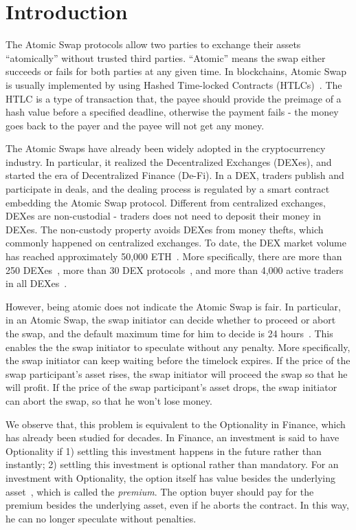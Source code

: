 \section{Introduction}
\label{sec:intro}

The Atomic Swap protocols allow two parties to exchange their assets ``atomically'' without trusted third parties.
``Atomic'' means the swap either succeeds or fails for both parties at any given time.
In blockchains, Atomic Swap is usually implemented by using Hashed Time-locked Contracts (HTLCs)~\cite{poon2016bitcoin}.
The HTLC is a type of transaction that, the payee should provide the preimage of a hash value before a specified deadline, otherwise the payment fails - the money goes back to the payer and the payee will not get any money.

The Atomic Swaps have already been widely adopted in the cryptocurrency industry.
In particular, it realized the Decentralized Exchanges (DEXes), and started the era of Decentralized Finance (De-Fi).
In a DEX, traders publish and participate in deals, and the dealing process is regulated by a smart contract embedding the Atomic Swap protocol.
Different from centralized exchanges, DEXes are non-custodial - traders does not need to deposit their money in DEXes.
The non-custody property avoids DEXes from money thefts, which commonly happened on centralized exchanges.
To date, the DEX market volume has reached approximately 50,000 ETH~\cite{dexwatch}.
More specifically,
there are more than 250 DEXes~\cite{distribuyed/index},
more than 30 DEX protocols~\cite{evbots/dex-protocols},
and more than 4,000 active traders in all DEXes~\cite{dexwatch}.



However, being atomic does not indicate the Atomic Swap is fair.
In particular, in an Atomic Swap, the swap initiator can decide whether to proceed or abort the swap, and the default maximum time for him to decide is 24 hours~\cite{nolan2013alt}.
This enables the the swap initiator to speculate without any penalty.
More specifically, the swap initiator can keep waiting before the timelock expires.
If the price of the swap participant's asset rises, the swap initiator will proceed the swap so that he will profit.
If the price of the swap participant's asset drops, the swap initiator can abort the swap, so that he won't lose money.

We observe that, this problem is equivalent to the Optionality in Finance, which has already been studied for decades.
In Finance, an investment is said to have Optionality if
1) settling this investment happens in the future rather than instantly;
2) settling this investment is optional rather than mandatory.
For an investment with Optionality, the option itself has value besides the underlying asset~\cite{higham2004introduction}, which is called the \textit{premium}.
The option buyer should pay for the premium besides the underlying asset, even if he aborts the contract.
In this way, he can no longer speculate without penalties.

